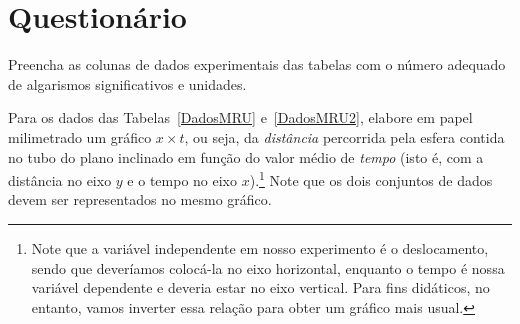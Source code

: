 \vspace{15mm}

\begin{fullwidth}
\noindent{}
\vspace{5mm}

\noindent{}

\noindent{}

\noindent{}

\noindent{}

\noindent{}
\end{fullwidth}

\vspace{5mm}

\section{Questionário}

\begin{question}[type={exam}]
Preencha as colunas de dados experimentais das tabelas com o número adequado de algarismos significativos e unidades.
\end{question}

\begin{question}[type={exam}]
Para os dados das Tabelas~\ref{DadosMRU} e~\ref{DadosMRU2}, elabore em papel milimetrado um gráfico $x \times t$, ou seja, da \emph{distância} percorrida pela esfera contida no tubo do plano inclinado em função do valor médio de \emph{tempo} (isto é, com a distância no eixo $y$ e o tempo no eixo $x$).\footnote{Note que a variável independente em nosso experimento é o deslocamento, sendo que deveríamos colocá-la no eixo horizontal, enquanto o tempo é nossa variável dependente e deveria estar no eixo vertical. Para fins didáticos, no entanto, vamos inverter essa relação para obter um gráfico mais usual.} Note que os dois conjuntos de dados devem ser representados no mesmo gráfico.
\end{question}

